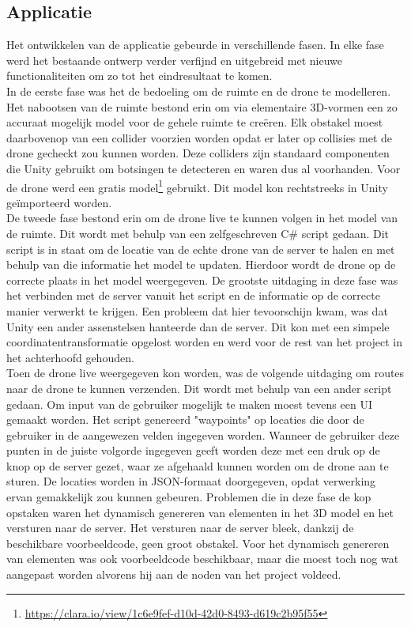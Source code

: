 \subsection{Applicatie} \label{sec:unity}
Het ontwikkelen van de applicatie gebeurde in verschillende fasen.
In elke fase werd het bestaande ontwerp verder verfijnd en uitgebreid met nieuwe functionaliteiten om zo tot het eindresultaat te komen.\\

In de eerste fase was het de bedoeling om de ruimte en de drone te modelleren.
Het nabootsen van de ruimte bestond erin om via elementaire 3D-vormen een zo accuraat mogelijk model voor de gehele ruimte te creëren.
Elk obstakel moest daarbovenop van een collider voorzien worden opdat er later op collisies met de drone gecheckt zou kunnen worden.
Deze colliders zijn standaard componenten die Unity gebruikt om botsingen te detecteren en waren dus al voorhanden.
Voor de drone werd een gratis model\footnote{\url{https://clara.io/view/1c6e9fef-d10d-42d0-8493-d619c2b95f55}} gebruikt.
Dit model kon rechtstreeks in Unity geïmporteerd worden.\\

De tweede fase bestond erin om de drone live te kunnen volgen in het model van de ruimte.
Dit wordt met behulp van een zelfgeschreven C\# script gedaan.
Dit script is in staat om de locatie van de echte drone van de server te halen en met behulp van die informatie het model te updaten.
Hierdoor wordt de drone op de correcte plaats in het model weergegeven.
De grootste uitdaging in deze fase was het verbinden met de server vanuit het script en de informatie op de correcte manier verwerkt te krijgen.
Een probleem dat hier tevoorschijn kwam, was dat Unity een ander assenstelsen hanteerde dan de server.
Dit kon met een simpele coordinatentransformatie opgelost worden en werd voor de rest van het project in het achterhoofd gehouden.\\

Toen de drone live weergegeven kon worden, was de volgende uitdaging om routes naar de drone te kunnen verzenden.
Dit wordt met behulp van een ander script gedaan.
Om input van de gebruiker mogelijk te maken moest tevens een UI gemaakt worden.
Het script genereerd "waypoints" op locaties die door de gebruiker in de aangewezen velden ingegeven worden.
Wanneer de gebruiker deze punten in de juiste volgorde ingegeven geeft worden deze met een druk op de knop op de server gezet, waar ze afgehaald kunnen worden om de drone aan te sturen.
De locaties worden in JSON-formaat doorgegeven, opdat verwerking ervan gemakkelijk zou kunnen gebeuren.
Problemen die in deze fase de kop opstaken waren het dynamisch genereren van elementen in het 3D model en het versturen naar de server.
Het versturen naar de server bleek, dankzij de beschikbare voorbeeldcode, geen groot obstakel.
Voor het dynamisch genereren van elementen was ook voorbeeldcode beschikbaar, maar die moest toch nog wat aangepast worden alvorens hij aan de noden van het project voldeed.\\

